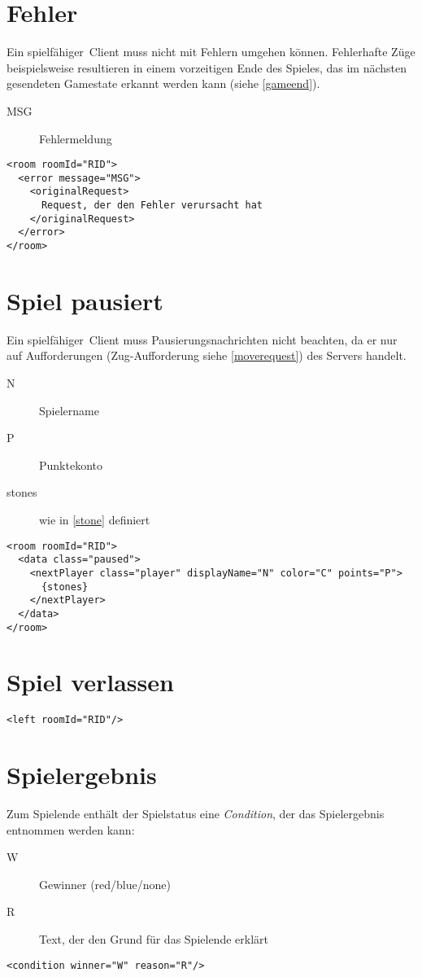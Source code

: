 \documentclass[12pt,a4paper, ngerman, oneside]{scrartcl}
\begin{document}
\section{Fehler}
Ein \glqq spielfähiger\grqq\ Client muss nicht mit Fehlern umgehen können.
Fehlerhafte Züge beispielsweise resultieren in einem vorzeitigen Ende des
Spieles, das im nächsten gesendeten Gamestate erkannt werden kann (siehe \ref{gameend}).
\begin{description}
\item[MSG] Fehlermeldung
\end{description}
\begin{verbatim}
<room roomId="RID">
  <error message="MSG">
    <originalRequest>
      Request, der den Fehler verursacht hat
    </originalRequest>
  </error>
</room>
\end{verbatim}

\section{Spiel pausiert}
Ein \glqq spielfähiger\grqq\ Client muss Pausierungsnachrichten nicht beachten,
da er nur auf Aufforderungen (Zug-Aufforderung siehe \ref{moverequest}) des Servers handelt.
\begin{description}
\item[N] Spielername
\item[P] Punktekonto
\item[stones] wie in \ref{stone} definiert
\end{description}
\begin{verbatim}
<room roomId="RID">
  <data class="paused">
    <nextPlayer class="player" displayName="N" color="C" points="P">
      {stones}
    </nextPlayer>
  </data>
</room>
\end{verbatim}

\section{Spiel verlassen}
\begin{verbatim}
<left roomId="RID"/>
\end{verbatim}


\section{\label{gameend}Spielergebnis}
Zum Spielende enthält der Spielstatus eine \textit{Condition}, der das Spielergebnis entnommen werden kann:
\begin{description}
\item[W] Gewinner (red/blue/none)
\item[R] Text, der den Grund für das Spielende erklärt
\end{description}
\begin{verbatim}
<condition winner="W" reason="R"/>
\end{verbatim}
\end{document}
